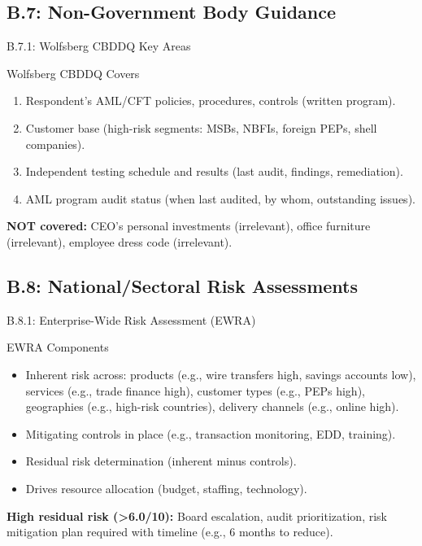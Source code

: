 \documentclass{beamer}
\begin{document}
	\subsection{B.7: Non-Government Body Guidance}
	
	\begin{frame}{B.7.1: Wolfsberg CBDDQ Key Areas}
		\begin{block}{Wolfsberg CBDDQ Covers}
			\begin{enumerate}
				\item Respondent's AML/CFT policies, procedures, controls (written program).
				\item Customer base (high-risk segments: MSBs, NBFIs, foreign PEPs, shell companies).
				\item Independent testing schedule and results (last audit, findings, remediation).
				\item AML program audit status (when last audited, by whom, outstanding issues).
			\end{enumerate}
		\end{block}
		\textbf{NOT covered:} CEO's personal investments (irrelevant), office furniture (irrelevant), employee dress code (irrelevant).
	\end{frame}
	
	\subsection{B.8: National/Sectoral Risk Assessments}
	
	\begin{frame}{B.8.1: Enterprise-Wide Risk Assessment (EWRA)}
		\begin{block}{EWRA Components}
			\begin{itemize}
				\item Inherent risk across: products (e.g., wire transfers high, savings accounts low), services (e.g., trade finance high), customer types (e.g., PEPs high), geographies (e.g., high-risk countries), delivery channels (e.g., online high).
				\item Mitigating controls in place (e.g., transaction monitoring, EDD, training).
				\item Residual risk determination (inherent minus controls).
				\item Drives resource allocation (budget, staffing, technology).
			\end{itemize}
		\end{block}
		\textbf{High residual risk (>6.0/10):} Board escalation, audit prioritization, risk mitigation plan required with timeline (e.g., 6 months to reduce).
	\end{frame}
	
\end{document}
